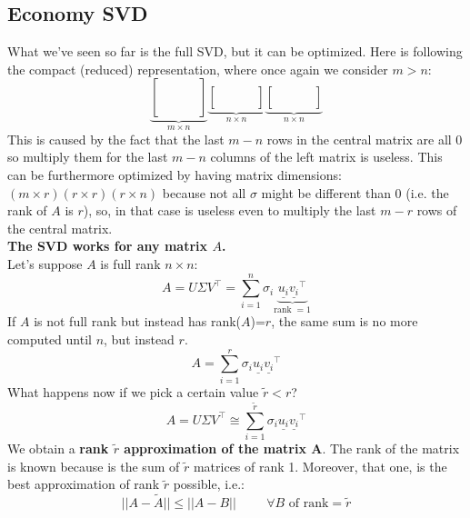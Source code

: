 \subsection*{Economy SVD}
What we've seen so far is the full SVD, but it can be optimized. Here is following the compact (reduced) representation, where once again we consider $m > n$:
\[
\underbrace{
  \begin{bmatrix}
    & & & \\
    & & & \\
    & & & \\
    & & & \\
    & & & \\
  \end{bmatrix}}_{m \times n}
\underbrace{
  \begin{bmatrix}
    & & & \\
    & & & \\
    & & & \\
  \end{bmatrix}}_{n \times n}
\underbrace{
  \begin{bmatrix}
    & & & \\
    & & & \\
    & & & \\
  \end{bmatrix}}_{n \times n}
\]
This is caused by the fact that the last $m-n$ rows in the central matrix are all 0 so multiply them for the last $m-n$ columns of the left matrix is useless. This can be furthermore optimized by having matrix dimensions: $(m\times r)(r\times r)(r\times n)$ because not all $\sigma$ might be different than 0 (i.e. the rank of $A$ is $r$), so, in that case is useless even to multiply the last $m-r$ rows of the central matrix. \\

\textbf{The SVD works for any matrix $A$.}\\

\noindent Let's suppose $A$ is full rank $n\times n$:
\[
    A = U\Sigma V^\intercal = \sum_{i = 1}^{n} \sigma_i \underbrace{\underline{u_i}\underline{v_i}^\intercal}_{\text{rank }=1}    
\]
If $A$ is not full rank but instead has rank($A$)=$r$, the same sum is no more computed until $n$, but instead $r$.
\[
    A = \sum_{i = 1}^{r} \sigma_i \underline{u_i}\underline{v_i}^\intercal   
\]
What happens now if we pick a certain value $\tilde{r} < r$?
\[
    A = U\Sigma V^\intercal \cong \sum_{i = 1}^{\tilde{r}} \sigma_i \underline{u_i}\underline{v_i}^\intercal   
\]
We obtain a \textbf{rank $\tilde{r}$ approximation of the matrix A}. The rank of the matrix is known because is the sum of $\tilde{r}$ matrices of rank 1. Moreover, that one, is the best approximation of rank $\tilde{r}$ possible, i.e.:
\[
    ||A - \tilde{A}|| \leq ||A - B|| \hspace{1cm} \forall B  \text{ of rank} = \tilde{r}    
\]

